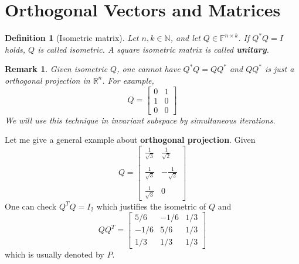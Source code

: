 \documentclass[dvipsnames, 12pt]{article}
\newtheorem{Definition}[Theorem]{Definition}
\newtheorem{Remark}[Theorem]{Remark}
\begin{document}
\newpage
\section{Orthogonal Vectors and Matrices}

\begin{Definition}[Isometric matrix]
     Let $n, k \in \mathbb{N}$, and let $Q \in \mathbb{F}^{n \times k}$. If $Q^{*} Q=I$ holds, $Q$ is called isometric. A square isometric matrix is called \textbf{unitary}. 
\end{Definition}

\begin{Remark}
    Given isometric $Q$, one cannot have $Q^{*}Q= QQ^{*}$ and $Q Q^{*}$ is just a orthogonal projection in $\mathbb{R}^{n}$. For example,
    $$
    Q = \begin{bmatrix}
        0 & 1\\
        1 & 0\\
        0 & 0
    \end{bmatrix}
    $$
    We will use this technique in invariant subspace by simultaneous iterations.
\end{Remark}


Let me give a general example about \textbf{orthogonal projection}. Given
$$
Q = \left[\begin{array}{cc}
    \frac{1}{\sqrt{3}} &  \frac{1}{\sqrt{2}}\\
                    &                       \\
    \frac{1}{\sqrt{3}} &  -\frac{1}{\sqrt{2}}\\
                        &                    \\
    \frac{1}{\sqrt{3}} &   0
\end{array}\right]
$$
One can check $Q^{T}Q = I_{2}$ which justifies the isometric of $Q$ and 
$$
QQ^{T} = \begin{bmatrix}
    5/6 & -1/6 & 1/3 \\
    -1/6 & 5/6 & 1/3\\
    1/3 & 1/3 & 1/3
\end{bmatrix}
$$
which is usually denoted by $P$.
\end{document}
